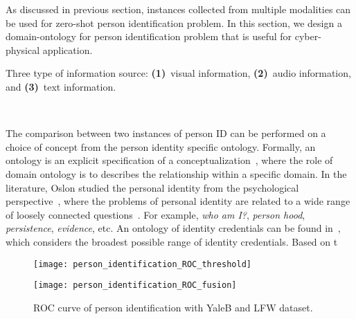 
As discussed in previous section, 
instances collected from multiple modalities can be used for zero-shot person identification problem.
In this section, 
we design a domain-ontology for person identification problem that is useful for cyber-physical application.

Three type of information source:
{\bf (1)}~visual information,
{\bf (2)}~audio information, and
{\bf (3)}~text information.

~

The comparison between two instances of person ID can be performed on a choice of concept from the person identity specific ontology.
Formally,
an ontology is an explicit specification of a conceptualization~\cite{Gruber_IJHCS_1995},
where the role of domain ontology is to describes the relationship within a specific domain.
In the literature,
Oslon studied the personal identity from the psychological perspective~\cite{Olson_encyclopedia_2009},
where the problems of personal identity are related to a wide range of loosely connected questions~\cite{Olson_SEP_2012}.
For example,
{\it who am I?},
{\it person hood},
{\it persistence},
{\it evidence},
etc.
An ontology of identity credentials can be found in~\cite{NIST_SP_800_103_2006},
which considers the broadest possible range of identity credentials.
Based on t

%
%  

\begin{figure}[!t]
  \begin{minipage}{1.0\columnwidth}
    \begin{minipage}{1.0\columnwidth}
      \begin{minipage}{0.03\columnwidth}  \centerline{}                                   \end{minipage}
      \begin{minipage}{0.96\columnwidth}  \centerline{\texttt{[image: person\_identification\_ROC\_threshold]}} \end{minipage}
    \end{minipage}
    \begin{minipage}{1.0\columnwidth}
      \begin{minipage}{0.03\columnwidth}  \centerline{}                                      \end{minipage}
      \begin{minipage}{0.96\columnwidth}  \centerline{\texttt{[image: person\_identification\_ROC\_fusion]}}    \end{minipage}
    \end{minipage}
  \end{minipage}
  \vspace{-3ex}
  \caption
    {
    \small
    ROC curve of person identification with YaleB and LFW dataset.
    }
  \label{fig:results_identification_ROC}
\end{figure}

